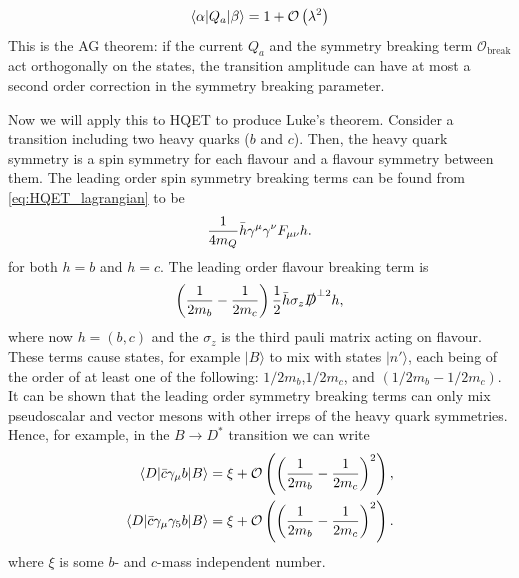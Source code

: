 \begin{align}
  \langle \alpha | Q_a | \beta \rangle = 1 + \mathcal{O}\left( \lambda^2 \right)
\end{align}
This is the AG theorem: if the current $Q_a$ and the symmetry breaking term $\mathcal{O}_{\text{break}}$ act orthogonally on the states, the transition amplitude can have at most a second order correction in the symmetry breaking parameter.

Now we will apply this to HQET to produce Luke's theorem. Consider a transition including two heavy quarks ($b$ and $c$). Then, the heavy quark symmetry is a spin symmetry for each flavour and a flavour symmetry between them. The leading order spin symmetry breaking terms can be found from \eqref{eq:HQET_lagrangian} to be
\begin{align}
  {1\over 4m_Q} \bar{h} \gamma^{\mu} \gamma^{\nu} F_{\mu\nu} h.
\end{align}
for both $h=b$ and $h=c$. The leading order flavour breaking term is
\begin{align}
  \left({1\over 2m_b} - {1\over 2m_c} \right) {1\over 2} \bar{h} \sigma_z \slashed{D}^{\perp 2} h,
\end{align}
where now $h = (b,c)$ and the $\sigma_z$ is the third pauli matrix acting on flavour. These terms cause states, for example $| B \rangle$ to mix with states $|n'\rangle$, each being of the order of at least one of the following: $1/2m_b$,$1/2m_c$, and $(1/2m_b - 1/2m_c)$. It can be shown \cite{Lebed:1991sq} that the leading order symmetry breaking terms can only mix pseudoscalar and vector mesons with other irreps of the heavy quark symmetries. Hence, for example, in the $B \to D^*$ transition we can write
\begin{align}
  \langle D | \bar{c}\gamma_{\mu} b | B \rangle &= \xi + \mathcal{O}\left( \left( {1\over 2m_b} - {1\over 2m_c} \right)^2 \right), \\
  \langle D | \bar{c}\gamma_{\mu}\gamma_5 b | B \rangle &= \xi + \mathcal{O}\left( \left( {1\over 2m_b} - {1\over 2m_c} \right)^2 \right).
\end{align}
where $\xi$ is some $b$- and $c$-mass independent number.

